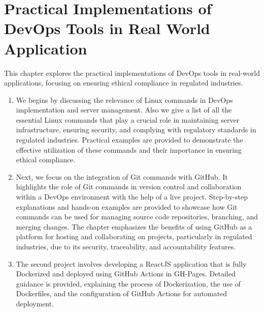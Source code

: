 \chapter{Practical Implementations of DevOps Tools in Real World Application}

This chapter explores the practical implementations of DevOps tools in real-world applications, focusing on ensuring ethical compliance in regulated industries.
\begin{enumerate}
    \item We begins by discussing the relevance of Linux commands in DevOps implementation and server management. Also we give a list of all the essential Linux commands that play a crucial role in maintaining server infrastructure, ensuring security, and complying with regulatory standards in regulated industries. Practical examples are provided to demonstrate the effective utilization of these commands and their importance in ensuring ethical compliance.

    \item Next, we focus on the integration of Git commands with GitHub. It highlights the role of Git commands in version control and collaboration within a DevOps environment with the help of a live project. Step-by-step explanations and hands-on examples are provided to showcase how Git commands can be used for managing source code repositories, branching, and merging changes. The chapter emphasizes the benefits of using GitHub as a platform for hosting and collaborating on projects, particularly in regulated industries, due to its security, traceability, and accountability features.

    \item The second project involves developing a ReactJS application that is fully Dockerized and deployed using GitHub Actions in GH-Pages. Detailed guidance is provided, explaining the process of Dockerization, the use of Dockerfiles, and the configuration of GitHub Actions for automated deployment.

\end{enumerate}

